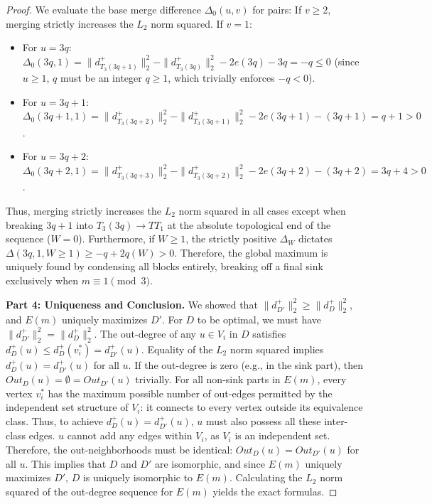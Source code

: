 \documentclass[a4paper]{amsart}
\begin{document}
\begin{proof}
    We evaluate the base merge difference $\Delta_0(u, v)$ for pairs:
    If $v \ge 2$, merging strictly increases the $L_2$ norm squared.
    If $v = 1$:
    \begin{itemize}
        \item For $u = 3q$: $\Delta_0(3q, 1) = \|d^+_{T_3(3q+1)}\|_2^2 - \|d^+_{T_3(3q)}\|_2^2 - 2e(3q) - 3q = -q \le 0$ (since $u \ge 1$, $q$ must be an integer $q \ge 1$, which trivially enforces $-q < 0$).
        \item For $u = 3q+1$: $\Delta_0(3q+1, 1) = \|d^+_{T_3(3q+2)}\|_2^2 - \|d^+_{T_3(3q+1)}\|_2^2 - 2e(3q+1) - (3q+1) = q + 1 > 0$.
        \item For $u = 3q+2$: $\Delta_0(3q+2, 1) = \|d^+_{T_3(3q+3)}\|_2^2 - \|d^+_{T_3(3q+2)}\|_2^2 - 2e(3q+2) - (3q+2) = 3q + 4 > 0$.
    \end{itemize}
    Thus, merging strictly increases the $L_2$ norm squared in all cases except when breaking $3q+1$ into $T_3(3q) \to TT_1$ at the absolute topological end of the sequence ($W=0$). Furthermore, if $W \ge 1$, the strictly positive $\Delta_W$ dictates $\Delta(3q, 1, W \ge 1) \ge -q + 2q(W) > 0$. Therefore, the global maximum is uniquely found by condensing all blocks entirely, breaking off a final sink exclusively when $m \equiv 1 \pmod 3$.

    \textbf{Part 4: Uniqueness and Conclusion.}
    We showed that $\|d^+_{D'}\|_2^2 \ge \|d^+_D\|_2^2$, and $E(m)$ uniquely maximizes $D'$. For $D$ to be optimal, we must have $\|d^+_{D'}\|_2^2 = \|d^+_D\|_2^2$. The out-degree of any $u \in V_i$ in $D$ satisfies $d^+_D(u) \le d^+_D(v_i^*) = d^+_{D'}(u)$. Equality of the $L_2$ norm squared implies $d^+_D(u) = d^+_{D'}(u)$ for all $u$. If the out-degree is zero (e.g., in the sink part), then $Out_D(u) = \emptyset = Out_{D'}(u)$ trivially. For all non-sink parts in $E(m)$, every vertex $v_i^*$ has the maximum possible number of out-edges permitted by the independent set structure of $V_i$: it connects to every vertex outside its equivalence class. Thus, to achieve $d^+_D(u) = d^+_{D'}(u)$, $u$ must also possess all these inter-class edges. $u$ cannot add any edges within $V_i$, as $V_i$ is an independent set. Therefore, the out-neighborhoods must be identical: $Out_D(u) = Out_{D'}(u)$ for all $u$. This implies that $D$ and $D'$ are isomorphic, and since $E(m)$ uniquely maximizes $D'$, $D$ is uniquely isomorphic to $E(m)$. 
    Calculating the $L_2$ norm squared of the out-degree sequence for $E(m)$ yields the exact formulas.
\end{proof}
\end{document}
